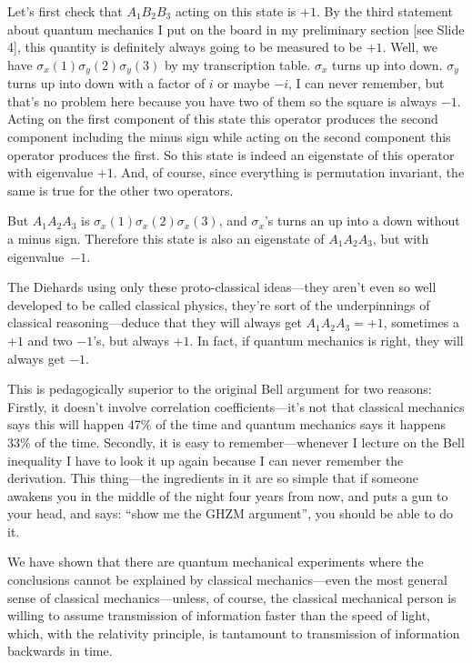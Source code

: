 \documentclass[12pt,nofootinbib]{revtex4}
\begin{document}
Let's first check that $A_1B_2B_3$ acting on this state is $+1$.
By the third statement about quantum mechanics I put on the board in my preliminary section [see Slide 4], this quantity is definitely always going to be measured to be $+1$. Well, we have $\sigma_x(1)\sigma_y(2)\sigma_y(3)$ by my transcription table. $\sigma_x$ turns up into down. $\sigma_y$ turns up into down with a factor of $i$ or maybe $-i$, I can never remember,
but that's no problem here because you have two of them so the square is always $-1$.  Acting on the first component of this state this operator produces the second component including the minus sign while acting on the second component this operator produces the first. So this state is indeed an eigenstate of this operator with eigenvalue $+1$. And, of course, since everything is permutation invariant, the same is true for the other two operators.

But $A_1A_2A_3$ is $\sigma_x(1)\sigma_x(2)\sigma_x(3)$, and $\sigma_x$'s turns an up into a down without a minus sign. Therefore this state is also an eigenstate of $A_1A_2A_3$, but with eigenvalue~$-1$.

The Diehards using only these proto-classical ideas---they aren't even so well developed to be called classical physics, they're sort of the underpinnings of classical reasoning---deduce that they will always get $A_1A_2A_3=+1$, sometimes a $+1$ and two $-1$'s, but always $+1$. In fact, if quantum mechanics is right, they will always get $-1$.

This is pedagogically superior to the original Bell argument for two reasons: Firstly, it doesn't involve correlation coefficients---it's not that classical mechanics says this will happen 47\% of the time and quantum mechanics says it happens 33\% of the time. Secondly, it is easy to remember---whenever I lecture on the Bell inequality I have to look it up again because I can never remember the derivation. This thing---the ingredients in it are so simple that if someone awakens you in the middle of the night four years from now, and puts a gun to your head, and says: ``show me the GHZM argument'', you should be able to do it.

We have shown that there are quantum mechanical experiments where the conclusions cannot be explained by classical mechanics---even the most general sense of classical mechanics---unless, of course, the classical mechanical person is willing to assume transmission of information faster than the speed of light, which, with the relativity principle, is tantamount to transmission of information backwards in time.
\end{document}
